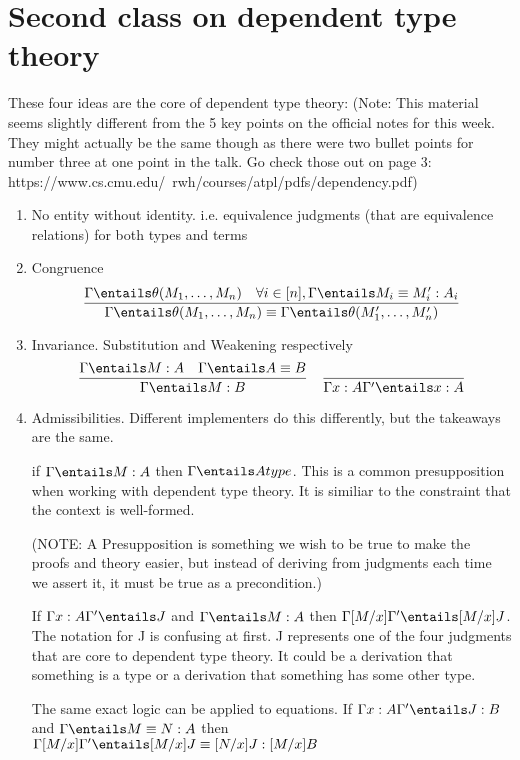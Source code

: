 \documentclass[11pt]{article}
\begin{document}
\section*{Second class on dependent type theory}
These four ideas are the core of dependent type theory: (Note: This material seems slightly different from the 5 key points on the official notes for this week. They might actually be the same though as there were two bullet points for number three at one point in the talk. Go check those out on page 3: https://www.cs.cmu.edu/~rwh/courses/atpl/pdfs/dependency.pdf)
\begin{enumerate}
    \item No entity without identity. i.e. equivalence judgments (that are equivalence relations) for both types and terms
    \item Congruence
    \[
    \frac{\Gamma \entails \theta(M_1, \dots, M_n) \quad \forall i \in [n], \Gamma \entails M_i \equiv M'_i : A_i}{\Gamma \entails \theta(M_1, \dots, M_n) \equiv \Gamma \entails \theta(M'_1, \dots, M'_n) }
    \]
    \item Invariance. Substitution and Weakening respectively
    \[
        \frac{\Gamma \entails M : A \quad \Gamma \entails A \equiv B}{\Gamma \entails M : B} \quad \frac{}{\Gamma x : A \Gamma' \entails x : A}
    \]
    \item Admissibilities. Different implementers do this differently, but the takeaways are the same.

    if $\Gamma \entails M : A$ then $\Gamma \entails A type$. This is a common presupposition when working with dependent type theory. It is similiar to the constraint that the context is well-formed.

    (NOTE: A Presupposition is something we wish to be true to make the proofs and theory easier, but instead of deriving from judgments each time we assert it, it must be true as a precondition.)

    If $\Gamma x : A \Gamma' \entails J$ and $\Gamma \entails M : A$ then $\Gamma [M / x] \Gamma' \entails [M/x]J$. The notation for J is confusing at first. J represents one of the four judgments that are core to dependent type theory. It could be a derivation that something is a type or a derivation that something has some other type.

    The same exact logic can be applied to equations. If $\Gamma x : A \Gamma' \entails J : B$ and $\Gamma \entails M \equiv N : A$ then $\Gamma [M / x] \Gamma' \entails [M / x] J \equiv [N / x] J: [M/x]B$

\end{enumerate}
\end{document}
